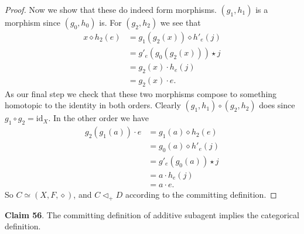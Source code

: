 \documentclass{article}
\begin{document}
\begin{proof}
Now we show that these do indeed form morphisms.
$(g_1, h_1)$ is a morphism since $(g_0, h_0)$ is.
For $(g_2, h_2)$ we see that
\[
\begin{split}
    x \diamond h_2(e) & = g_1(g_2(x)) \diamond h'_e(j) \\
                      & = g'_e(g_0(g_2(x))) \star j \\
                      & = g_2(x) \cdot h_e(j) \\
                      & = g_2(x) \cdot e.
\end{split}
\]
As our final step we check that these two morphisms compose to something homotopic to the identity in both orders.
Clearly $(g_1, h_1) \circ (g_2, h_2)$ does since $g_1 \circ g_2 = \text{id}_X$.
In the other order we have
\[
\begin{split}
    g_2(g_1(a)) \cdot e & = g_1(a) \diamond h_2(e) \\
                        & = g_0(a) \diamond h'_e(j) \\
                        & = g'_e(g_0(a)) \star j \\
                        & = a \cdot h_e(j) \\
                        & = a \cdot e.
\end{split}
\]
So $C \simeq (X, F, \diamond)$, and $C \triangleleft_{+} D$ according to the committing definition.
\end{proof}

\bigskip
\noindent \textbf{Claim 56}. The committing definition of additive subagent implies the categorical definition.
\end{document}
